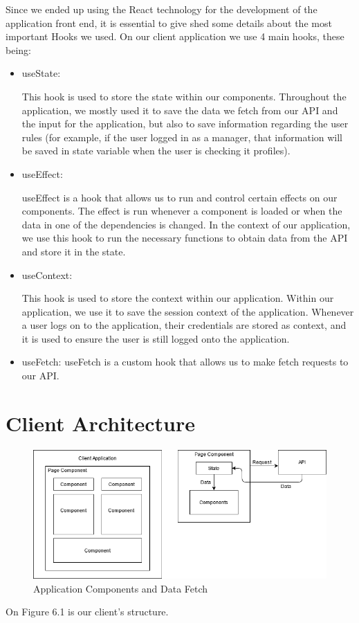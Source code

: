 \documentclass[a4paper,twoside,10pt]{report}
\begin{document}
Since we ended up using the React technology for the development of the application front end, it is essential to give shed some details about the most important Hooks we used.
\newline
On our client application we use 4 main hooks, these being:
\newpage
 \begin{itemize}
	\item useState\cite{USESTATE}:

This hook is used to store the state within our components. Throughout the application, we mostly used it to save the data we fetch from our API and the input for the application, but also to save information regarding the user rules (for example, if the user logged in as a manager, that information will be saved in state variable when the user is checking it profiles).
	\item useEffect\cite{USEEFFECT}:

useEffect is a hook that allows us to run and control certain effects on our components. The effect is run whenever a component is loaded or when the data in one of the dependencies is changed. In the context of our application, we use this hook to run the necessary functions to obtain data from the API and store it in the state.
	\item useContext\cite{USECONTEXT}:

This hook is used to store the context within our application. Within our application, we use it to save the session context of the application. Whenever a user logs on to the application, their credentials are stored as context, and it is used to ensure the user is still logged onto the application.
	\item useFetch\cite{USEFETCH}: useFetch is a custom hook that allows us to make fetch requests to our API.
\end{itemize}

\section{Client Architecture}
\begin{figure}[h!]
\center
  \includegraphics[width=\textwidth]{client app architecture.png}
\caption{Application Components and Data Fetch}
\end{figure}
On Figure 6.1 is our client's structure. 
\end{document}
